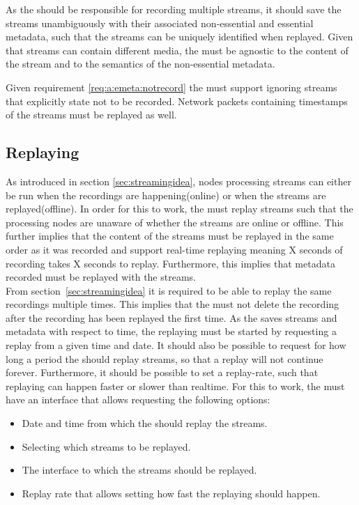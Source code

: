 As the \hist{} should be responsible for recording multiple streams, it should save the streams unambiguously with their associated non-essential and essential metadata, such that the streams can be uniquely identified when replayed.
Given that streams can contain different media, the \hist{} must be agnostic to the content of the stream and to the semantics of the non-essential metadata.

Given requirement \ref{req:a:emeta:notrecord} the  must support ignoring streams that explicitly state not to be recorded. Network packets containing timestamps of the streams must be replayed as well.


\subsection{Replaying}
As introduced in section \ref{sec:streamingidea}, nodes processing streams can either be run when the recordings are happening(online) or when the streams are replayed(offline). In order for this to work, the  must replay streams such that the processing nodes are unaware of whether the streams are online or offline. This further implies that the content of the streams must be replayed in the same order as it was recorded and support real-time replaying meaning X seconds of recording takes X seconds to replay. Furthermore, this implies that metadata recorded must be replayed with the streams.\\

From section~\ref{sec:streamingidea} it is required to be able to replay the same recordings multiple times. This implies that the  must not delete the recording after the recording has been replayed the first time.
As the  saves streams and metadata with respect to time, the replaying must be started by requesting a replay from a given time and date. It should also be possible to request for how long a period the  should replay streams, so that a replay will not continue forever.
Furthermore, it should be possible to set a replay-rate, such that replaying can happen faster or slower than realtime. For this to work, the  must have an interface that allows requesting the following options:

\begin{itemize}
	\item Date and time from which the  should replay the streams.
	\item Selecting which streams to be replayed.
	\item The interface to which the streams should be replayed.
	\item Replay rate that allows setting how fast the replaying should happen. 
\end{itemize}

